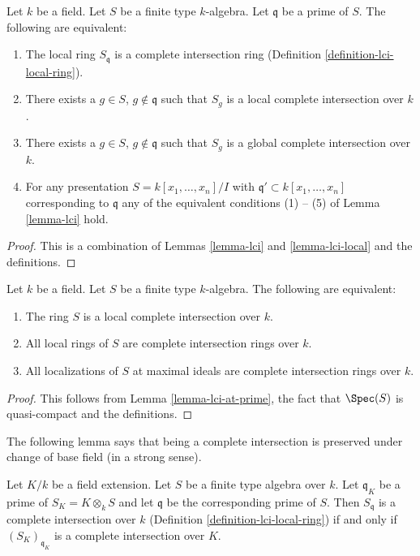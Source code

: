 \begin{lemma}
\label{lemma-lci-at-prime}
Let $k$ be a field. Let $S$ be a finite type $k$-algebra.
Let $\mathfrak q$ be a prime of $S$. The following are
equivalent:
\begin{enumerate}
\item The local ring $S_{\mathfrak q}$ is a complete intersection
ring (Definition \ref{definition-lci-local-ring}).
\item There exists a $g \in S$, $g \not \in \mathfrak q$
such that $S_g$ is a local complete intersection over $k$.
\item There exists a $g \in S$, $g \not \in \mathfrak q$
such that $S_g$ is a global complete intersection over $k$.
\item For any presentation $S = k[x_1, \ldots, x_n]/I$ with
$\mathfrak q' \subset k[x_1, \ldots, x_n]$ corresponding to $\mathfrak q$
any of the equivalent conditions (1) -- (5) of Lemma \ref{lemma-lci} hold.
\end{enumerate}
\end{lemma}

\begin{proof}
This is a combination of Lemmas \ref{lemma-lci} and \ref{lemma-lci-local}
and the definitions.
\end{proof}

\begin{lemma}
\label{lemma-lci-global}
Let $k$ be a field. Let $S$ be a finite type $k$-algebra.
The following are equivalent:
\begin{enumerate}
\item The ring $S$ is a local complete intersection over $k$.
\item All local rings of $S$ are complete intersection rings over $k$.
\item All localizations of $S$
at maximal ideals are complete intersection rings over $k$.
\end{enumerate}
\end{lemma}

\begin{proof}
This follows from Lemma \ref{lemma-lci-at-prime},
the fact that $\Spec(S)$ is quasi-compact and the definitions.
\end{proof}

\noindent
The following lemma says that being a complete intersection is
preserved under change of base field (in a strong sense).

\begin{lemma}
\label{lemma-lci-field-change-local}
Let $K/k$ be a field extension.
Let $S$ be a finite type algebra over $k$.
Let $\mathfrak q_K$ be a prime of $S_K = K \otimes_k S$
and let $\mathfrak q$ be the corresponding prime of $S$.
Then $S_{\mathfrak q}$ is a complete intersection
over $k$ (Definition \ref{definition-lci-local-ring})
if and only if $(S_K)_{\mathfrak q_K}$ is a complete
intersection over $K$.
\end{lemma}

